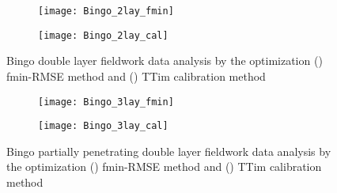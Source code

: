 \begin{figure}[h!]
	\centering
	\begin{subfigure}[b]{0.65\linewidth}
		\centering\texttt{[image: Bingo\_2lay\_fmin]}
		\captionsetup{justification=centering}		
		\caption{\label{fig:Bingo_2lay_fmin}}
		\end{subfigure}\vfill
	\begin{subfigure}[b]{0.65\linewidth}
		\centering\texttt{[image: Bingo\_2lay\_cal]}
		\captionsetup{justification=centering}		
		\caption{\label{fig:Bingo_2lay_cal}}
		\end{subfigure}
	\captionsetup{justification=centering}	
	\caption{Bingo double layer fieldwork data analysis by the optimization () fmin-RMSE method and () TTim calibration method} 
	\label{fig:Bingo_2lay_analysis}
\end{figure} 

\begin{figure}[h!]
	\centering
	\begin{subfigure}[b]{0.65\linewidth}
		\centering\texttt{[image: Bingo\_3lay\_fmin]}
		\captionsetup{justification=centering}		
		\caption{\label{fig:Bingo_3lay_fmin}}
		\end{subfigure}\vfill
	\begin{subfigure}[b]{0.65\linewidth}
		\centering\texttt{[image: Bingo\_3lay\_cal]}
		\captionsetup{justification=centering}		
		\caption{\label{fig:Bingo_3lay_cal}}
		\end{subfigure}
	\captionsetup{justification=centering}	
	\caption{Bingo partially penetrating double layer fieldwork data analysis by the optimization () fmin-RMSE method and () TTim calibration method} 
	\label{fig:Bingo_3lay_analysis}
\end{figure} 

\clearpage

